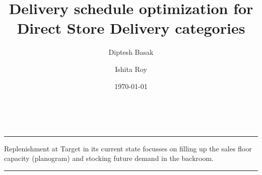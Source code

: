 \documentclass[titlepage]{article}
\title{Delivery schedule optimization for Direct Store Delivery categories}
\author{
Diptesh Basak\\
\and
Ishita Roy\\
}
\date{\today}
\renewenvironment{abstract}
 {\par\noindent\textbf{\Large\abstractname}\\ \ignorespaces}
 {\par\medskip}
\begin{document}
\maketitle


\pagebreak

\begin{abstract}
\hrule
\hfill
\doublespacing
\newline Replenishment at Target in its current state focusses on filling up the sales floor capacity (planogram) and stocking future demand in the backroom. 

\end{abstract}

\pagebreak

\tableofcontents

\listoftables

\pagebreak

\hrule
\end{document}
